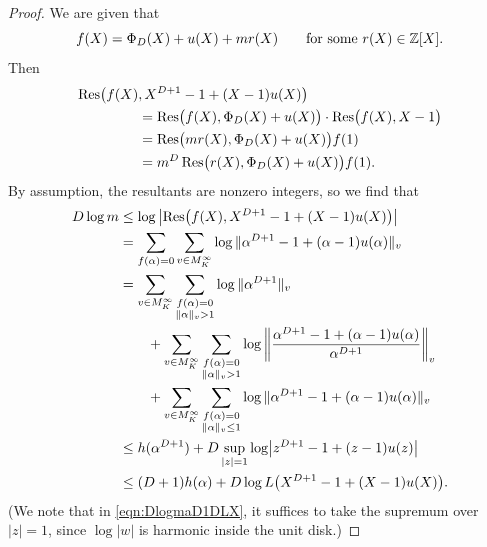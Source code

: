 \documentclass[12pt,reqno]{amsart}
\begin{document}
\begin{proof}
We are given that
\[
  f(X) = \Phi_D(X) + u(X) + mr(X)
  \qquad\text{for some $r(X)\in\mathbb{Z}[X]$.}
\]
Then
\begin{align*}
  \operatorname{Res}\bigl(f(X)&,X^{D+1}-1+(X-1)u(X)\bigr)\\*
  &= \operatorname{Res}\bigl(f(X),\Phi_D(X)+u(X)\bigr)
     \cdot\operatorname{Res}\bigl(f(X),X-1\bigr) \\
  &= \operatorname{Res}\bigl(mr(X),\Phi_D(X)+u(X)\bigr)f(1) \\
  &= m^D\operatorname{Res}\bigl(r(X),\Phi_D(X)+u(X)\bigr)f(1).
\end{align*}
By assumption, the resultants are nonzero integers, so we find that
\begin{align}
  \label{eqn:DlogmaD1DLX}
  D\log m
  &\le \log\left|\operatorname{Res}\bigl(f(X),X^{D+1}-1+(X-1)u(X)\bigr)\right| 
    \notag\\
  &= \sum_{f(\alpha)=0} \sum_{v\in M_K^\infty} \log\|\alpha^{D+1}-1+(\alpha-1)u(\alpha)\|_v
    \notag\\
  &= \sum_{v\in M_K^\infty}\sum_{\substack{f(\alpha)=0\\\|\alpha\|_v>1\\}} \log\|\alpha^{D+1}\|_v \notag\\
  &\qquad{}  + \sum_{v\in M_K^\infty}\sum_{\substack{f(\alpha)=0\\\|\alpha\|_v>1\\}} 
            \log\left\|\frac{\alpha^{D+1}-1+(\alpha-1)u(\alpha)}{\alpha^{D+1}}\right\|_v \notag\\
  &\qquad{}  + \sum_{v\in M_K^\infty}\sum_{\substack{f(\alpha)=0\\\|\alpha\|_v\le1\\}} 
                  \log\|\alpha^{D+1}-1+(\alpha-1)u(\alpha)\|_v  \notag\\
  &\le h(\alpha^{D+1}) + D\sup_{|z|=1}\log\bigl|z^{D+1}-1+(z-1)u(z)\bigr| \\
  &\le (D+1)h(\alpha) + D\log L\bigl(X^{D+1}-1+(X-1)u(X)\bigr). \notag
\end{align}
(We note that in \eqref{eqn:DlogmaD1DLX}, it suffices to take the
supremum over~$|z|=1$, since $\log|w|$ is harmonic inside the unit
disk.)
\end{proof}
\end{document}
